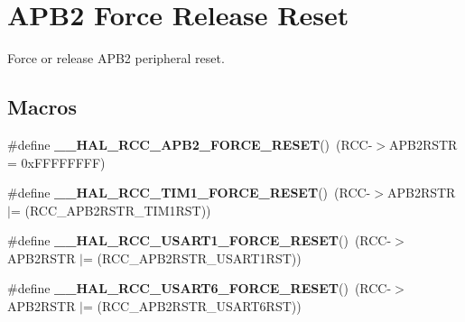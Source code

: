 \hypertarget{group___r_c_c___a_p_b2___force___release___reset}{}\section{A\+P\+B2 Force Release Reset}
\label{group___r_c_c___a_p_b2___force___release___reset}


Force or release A\+P\+B2 peripheral reset.  


\subsection*{Macros}
\begin{DoxyCompactItemize}
\item 
\#define {\bfseries \+\_\+\+\_\+\+H\+A\+L\+\_\+\+R\+C\+C\+\_\+\+A\+P\+B2\+\_\+\+F\+O\+R\+C\+E\+\_\+\+R\+E\+S\+ET}()~(R\+CC-\/$>$A\+P\+B2\+R\+S\+TR = 0x\+F\+F\+F\+F\+F\+F\+F\+F)\hypertarget{group___r_c_c___a_p_b2___force___release___reset_ga8788da8c644ad0cc54912baede7d49b4}{}\label{group___r_c_c___a_p_b2___force___release___reset_ga8788da8c644ad0cc54912baede7d49b4}

\item 
\#define {\bfseries \+\_\+\+\_\+\+H\+A\+L\+\_\+\+R\+C\+C\+\_\+\+T\+I\+M1\+\_\+\+F\+O\+R\+C\+E\+\_\+\+R\+E\+S\+ET}()~(R\+CC-\/$>$A\+P\+B2\+R\+S\+TR $\vert$= (R\+C\+C\+\_\+\+A\+P\+B2\+R\+S\+T\+R\+\_\+\+T\+I\+M1\+R\+ST))\hypertarget{group___r_c_c___a_p_b2___force___release___reset_gac423d6a52fa42423119844e4a7d68c7b}{}\label{group___r_c_c___a_p_b2___force___release___reset_gac423d6a52fa42423119844e4a7d68c7b}

\item 
\#define {\bfseries \+\_\+\+\_\+\+H\+A\+L\+\_\+\+R\+C\+C\+\_\+\+U\+S\+A\+R\+T1\+\_\+\+F\+O\+R\+C\+E\+\_\+\+R\+E\+S\+ET}()~(R\+CC-\/$>$A\+P\+B2\+R\+S\+TR $\vert$= (R\+C\+C\+\_\+\+A\+P\+B2\+R\+S\+T\+R\+\_\+\+U\+S\+A\+R\+T1\+R\+ST))\hypertarget{group___r_c_c___a_p_b2___force___release___reset_ga5db01cf30bf3c5c7fc0b42220f4c70ad}{}\label{group___r_c_c___a_p_b2___force___release___reset_ga5db01cf30bf3c5c7fc0b42220f4c70ad}

\item 
\#define {\bfseries \+\_\+\+\_\+\+H\+A\+L\+\_\+\+R\+C\+C\+\_\+\+U\+S\+A\+R\+T6\+\_\+\+F\+O\+R\+C\+E\+\_\+\+R\+E\+S\+ET}()~(R\+CC-\/$>$A\+P\+B2\+R\+S\+TR $\vert$= (R\+C\+C\+\_\+\+A\+P\+B2\+R\+S\+T\+R\+\_\+\+U\+S\+A\+R\+T6\+R\+ST))\hypertarget{group___r_c_c___a_p_b2___force___release___reset_ga36242e7bdc7abbbdc33c06e72c4b45c7}{}\label{group___r_c_c___a_p_b2___force___release___reset_ga36242e7bdc7abbbdc33c06e72c4b45c7}


\end{DoxyCompactItemize}
